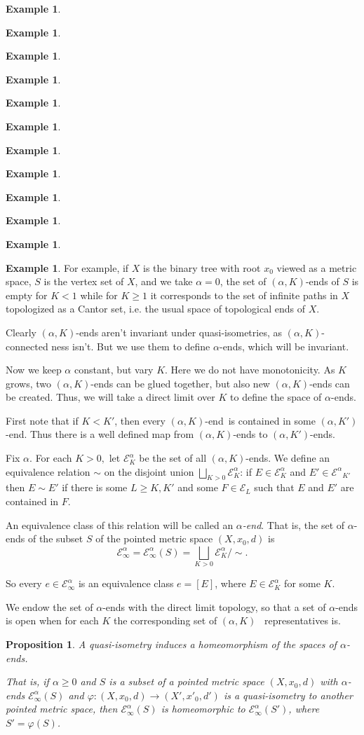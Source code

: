 \documentclass[12pt]{amsart}
\newtheorem{proposition}[theorem]{Proposition}
\theoremstyle{definition}
\newtheorem{example}[theorem]{Example}
\theoremstyle{remark}
\numberwithin{equation}{section}
\newcommand{\ph}{\varphi}
\newcommand{\ak}{$(\alpha,K)$}
\newcommand{\akconn}{$(\alpha,K)$-connected}
\newcommand{\akend}{$(\alpha,K)$-end}
\newcommand{\akpend}{$(\alpha,K')$-end}
\newcommand{\aend}{$\alpha$-end}
\newcommand{\calek}{{\mathcal E}^\alpha_K}
\newcommand{\calekp}{{\mathcal E^\alpha}_{K'}}
\newcommand{\caleinf}{{\mathcal E}^\alpha_\infty}
\begin{document}
\begin{example}
\begin{example}
\begin{example}
\begin{example}
\begin{example}
\begin{example}
\begin{example}
\begin{example}
\begin{example}
\begin{example}
\begin{example}
\begin{example}
For example, if $X$ is the binary tree with root $x_0$ viewed as a
metric space, $S$ is the vertex set of $X$, and we take $\alpha = 0$,
the set of \akend s of $S$ is empty for $K<1$ while for $K \ge 1$ it
corresponds to the set of infinite paths in $X$ topologized as a
Cantor set, i.e. the usual space of topological ends of $X$.

Clearly \akend s aren't invariant under quasi-isometries, as \akconn
ness isn't. But we use them to define \aend s, which will be
invariant.

Now we keep $\alpha$ constant, but vary $K$. Here we do not have
monotonicity. As $K$ grows, two \akend s can be glued together, but
also new \akend s can be created. Thus, we will take a direct limit
over $K$ to define the space of \aend s.

First note that if $K<K'$, then every \akend \ is contained in some
\akpend. Thus there is a well defined map from \akend s to \akpend s.

Fix $\alpha.$ For each $K>0,$ let $\calek$ be the set of all \akend s.
We define an equivalence relation $\sim$ on the disjoint union
$\bigsqcup_{K>0} \calek$: if $E \in \calek$ and $E' \in \calekp$ then
$E \sim E'$ if there is some $L \geq K,K'$ and some $F \in {\mathcal
  E}_L$ such that $E$ and $E'$ are contained in $F$.

An equivalence class of this relation will be called an
\emph{$\alpha$-end}. That is, the set of \aend s of the subset $S$ of
the pointed metric space $(X,x_0,d)$ is
\begin{equation*}
\caleinf = \caleinf(S) = \bigsqcup_{K>0} \calek / \sim.
\end{equation*}

So every $e \in \caleinf$ is an equivalence class $e=[E]$, where $E
\in \calek$ for some $K$.

We endow the set of \aend s with the direct limit topology, so that a
set of \aend s is open when for each $K$ the corresponding set of \ak
\ representatives is.

\begin{proposition}\label{aendinvariance}
A quasi-isometry induces a homeomorphism of the spaces of \aend s.

That is, if $\alpha \geq 0$ and $S$ is a subset of a pointed metric
space $(X,x_0,d)$ with \aend s $\caleinf(S)$ and $\ph: (X,x_0,d) \to
(X',x'_0,d')$ is a quasi-isometry to another pointed metric space,
then $\caleinf(S)$ is homeomorphic to $\caleinf(S')$, where
$S'=\ph(S)$.
\end{proposition}


\end{example}
\end{example}
\end{example}
\end{example}
\end{example}
\end{example}
\end{example}
\end{example}
\end{example}
\end{example}
\end{example}
\end{example}
\end{document}
